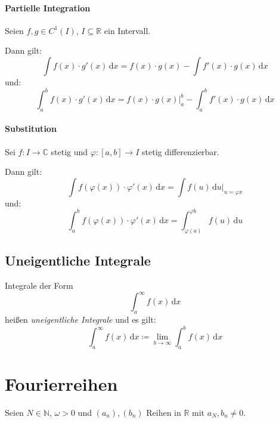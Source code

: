 				\paragraph{Partielle Integration}
					Seien $ f, g \in C ^ 1 (I) $, $ I \subseteq \mathbb{R} $ ein Intervall.

					Dann gilt:
					\begin{equation*}
						\int \! f(x) \cdot g'(x) \, \mathrm{d}x = f(x) \cdot g(x) - \int \! f'(x) \cdot g(x) \, \mathrm{d}x
					\end{equation*}
					und:
					\begin{equation*}
						\int _ a ^ b \! f(x) \cdot g'(x) \, \mathrm{d}x = f(x) \cdot g(x) \Bigr| _ a ^ b - \int _ a ^ b \! f'(x) \cdot g(x) \, \mathrm{d}x
					\end{equation*}

				\paragraph{Substitution}
					Sei $ f : I \rightarrow \mathbb{C} $ stetig und $ \varphi : [a, b] \rightarrow I $ stetig differenzierbar.

					Dann gilt:
					\begin{equation*}
						\int \! f(\varphi(x)) \cdot \varphi'(x) \, \mathrm{d}x = \int \! f(u) \, \mathrm{d}u \Bigr| _ { u = \varphi{x} }
					\end{equation*}
					und:
					\begin{equation*}
						\int _ a ^ b \! f(\varphi(x)) \cdot \varphi'(x) \, \mathrm{d}x = \int _ { \varphi(a) } ^ { \varphi{b} } \! f(u) \, \mathrm{d}u
					\end{equation*}

			\subsection{Uneigentliche Integrale}
				Integrale der Form \[ \int _ a ^ \infty \! f(x) \, \mathrm{d}x \] heißen \textit{uneigentliche Integrale} und es gilt:
				\begin{equation*}
					\int _ a ^ \infty \! f(x) \, \mathrm{d}x \coloneqq \lim _ { b \rightarrow \infty } \int _ a ^ b \! f(x) \, \mathrm{d}x
				\end{equation*}

		\section{Fourierreihen}
			Seien $ N \in \mathbb{N} $, $ \omega > 0 $ und $ (a _ n), (b _ n) $ Reihen in $ \mathbb{R} $ mit $ a _ N, b _ n \neq 0 $.

